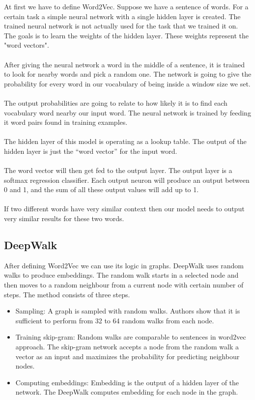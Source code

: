 At first we have to define Word2Vec. Suppose we have a sentence of words. For a certain task a simple neural network with a single hidden layer is created. The trained neural network is not actually used for the task that we trained it on. The goals is to learn the weights of the hidden layer. These weights represent the "word vectors".
\\
\\
After giving the neural network a word in the middle of a sentence, it is trained to look for nearby words and pick a random one. The network is going to give the probability for every word in our vocabulary of being inside a window size we set.
\\
\\
The output probabilities are going to relate to how likely it is to find each vocabulary word nearby our input word. The neural network is trained by feeding it word pairs found in training examples.
\\
\\
The hidden layer of this model is operating as a lookup table. The output of the hidden layer is just the “word vector” for the input word.
\\
\\
The word vector will then get fed to the output layer. The output layer is a softmax regression classifier. Each output neuron will produce an output between 0 and 1, and the sum of all these output values will add up to 1.
\\
\\
If two different words have very similar context then our model needs to output very similar results for these two words.


\subsection{DeepWalk}

After defining Word2Vec we can use its logic in graphs. DeepWalk uses random walks to produce embeddings. The random walk starts in a selected node and then moves to a random neighbour from a current node with certain number of steps. The method consists of three steps.

 \begin{itemize}
  \item Sampling: A graph is sampled with random walks. Authors show that it is sufficient to perform from 32 to 64 random walks from each node. 
  
    
  \item Training skip-gram: Random walks are comparable to sentences in word2vec approach. The skip-gram network accepts a node from the random walk a vector as an input and maximizes the probability for predicting neighbour nodes. 
  
  \item Computing embeddings: Embedding is the output of a hidden layer of the network. The DeepWalk computes embedding for each node in the graph.
   
  \end{itemize}

